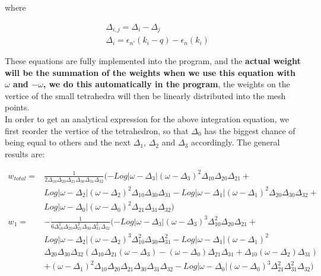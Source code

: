\documentclass[10pt]{article}
\begin{document}
where

\begin{subequations}\label{wtdif2}
\begin{align}
&\Delta_{i,j}=\Delta_{i}-\Delta_{j}\\
&\Delta_{i}=\epsilon_{n'}(k_i-q)-\epsilon_{n}(k_i)
\end{align}
\end{subequations}

These equations are fully implemented into the program, and the \textbf{actual weight will be the summation of the weights when we use this equation with $\omega$ and $-\omega$, we do this automatically in the program}, the weights on the vertice of the small tetrahedra will then be linearly distributed into the mesh points.\\ 

In order to get an analytical expression for the above integration equation, we first reorder the vertice of the tetrahedron, so that $\Delta_0$ has the biggest chance of being equal to others and the next $\Delta_1$, $\Delta_2$ and $\Delta_3$ accordingly. The general results are:

\begin{subequations}\label{wtt1}
\begin{align}
w_{total}=&\frac{1}{2\Delta_{10}\Delta_{20}\Delta_{21}\Delta_{30}\Delta_{31}\Delta_{32}}(-Log|\omega-\Delta_3|(\omega-\Delta_3)^2\Delta_{10}\Delta_{20}\Delta_{21}+\nonumber\\&
Log|\omega-\Delta_2|(\omega-\Delta_2)^2\Delta_{10}\Delta_{30}\Delta_{31}-Log|\omega-\Delta_1|(\omega-\Delta_1)^2\Delta_{20}\Delta_{30}\Delta_{32}+\nonumber\\&Log|\omega-\Delta_0|(\omega-\Delta_0)^2\Delta_{21}\Delta_{31}\Delta_{32})\\
w_{1}=&-\frac{1}{6\Delta_{10}^2\Delta_{20}\Delta_{21}^2\Delta_{30}\Delta_{31}^2\Delta_{32}}(-Log|\omega-\Delta_3|(\omega-\Delta_3)^3\Delta_{10}^2\Delta_{20}\Delta_{21}+\nonumber\\&
Log|\omega-\Delta_2|(\omega-\Delta_2)^3\Delta_{10}^2\Delta_{30}\Delta_{31}^2-Log|\omega-\Delta_1|(\omega-\Delta_1)^2\nonumber\\&\Delta_{20}\Delta_{30}\Delta_{32}(\Delta_{10}\Delta_{21}(\omega-\Delta_3)-(\omega-\Delta_0)\Delta_{21}\Delta_{31}+\Delta_{10}(\omega-\Delta_2)\Delta_{31})\nonumber\\&+(\omega-\Delta_1)^2\Delta_{10}\Delta_{20}\Delta_{21}\Delta_{30}\Delta_{31}\Delta_{32}-Log|\omega-\Delta_0|(\omega-\Delta_0)^3\Delta_{21}^2\Delta_{31}^2\Delta_{32})
\end{align}
\end{subequations}
 
\end{document}
